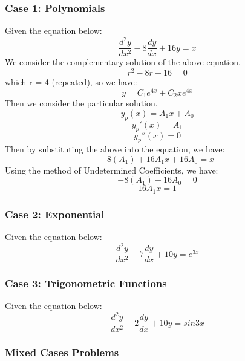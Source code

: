 \documentclass{article}
\begin{document}
\subsubsection{Case 1: Polynomials}
Given the equation below:
\begin{equation*}
	\frac{d^2y}{dx^2} - 8\frac{dy}{dx} + 16y = x
\end{equation*}
We consider the complementary solution of the above equation.
\begin{equation*}
	r^2-8r+16=0
\end{equation*}
which r = 4 (repeated), so we have:
\begin{equation*}
	y = C_1e^{4x} + C_2xe^{4x}
\end{equation*}
Then we consider the particular solution.
\begin{equation*}
	y_p(x) = A_1x+A_0
\end{equation*}
\begin{equation*}
	y_p'(x) = A_1
\end{equation*}
\begin{equation*}
	y_p''(x) = 0
\end{equation*}
Then by substituting the above into the equation, we have:
\begin{equation*}
	-8(A_1)+16A_1x+16A_0 = x
\end{equation*}
Using the method of Undetermined Coefficients, we have:
\begin{equation}
	-8(A_1)+16A_0 = 0
\end{equation}
\begin{equation}
	16A_1x = 1
\end{equation}
\subsubsection{Case 2: Exponential}
Given the equation below:
\begin{equation*}
	\frac{d^2y}{dx^2} - 7\frac{dy}{dx} + 10y = e^{3x}
\end{equation*}
\subsubsection{Case 3: Trigonometric Functions}
Given the equation below:
\begin{equation*}
	\frac{d^2y}{dx^2} - 2\frac{dy}{dx} + 10y = sin3x
\end{equation*}
\subsubsection{Mixed Cases Problems}
\end{document}
